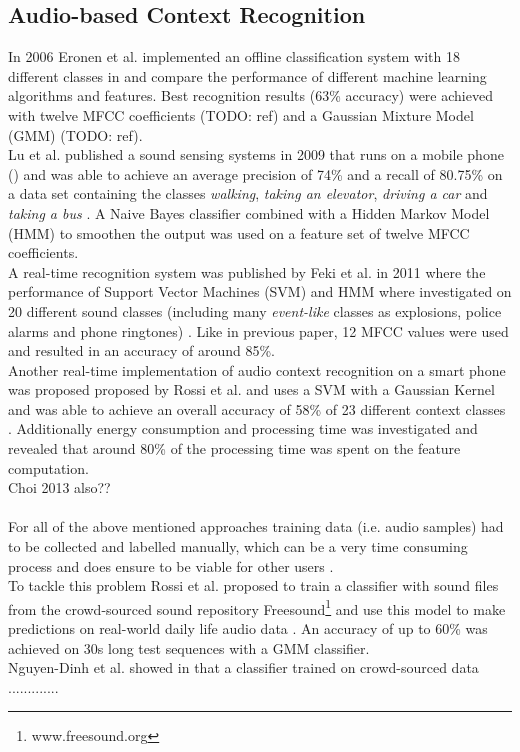 \subsection{Audio-based Context Recognition}\label{abc}
In 2006 Eronen et al. implemented an offline classification system with 18 different classes in \cite{Eronen2006} and compare the performance of different machine learning algorithms and features. Best recognition results (63\% accuracy) were achieved with twelve MFCC coefficients (TODO: ref) and a Gaussian Mixture Model (GMM) (TODO: ref).\\
Lu et al. published a sound sensing systems in 2009 that runs on a mobile phone () and was able to achieve an average precision of 74\% and a recall of 80.75\% on a data set containing the classes \textit{walking}, \textit{taking an elevator}, \textit{driving a car} and \textit{taking a bus} \cite{Lu2009}. A Naive Bayes classifier combined with a Hidden Markov Model (HMM) to smoothen the output was used on a feature set of twelve MFCC coefficients.\\
A real-time recognition system was published by Feki et al. in 2011 where the performance of Support Vector Machines (SVM) and HMM where investigated on 20 different sound classes (including many \textit{event-like} classes as explosions, police alarms and phone ringtones) \cite{Feki2011}. Like in previous paper, 12 MFCC values were used and resulted in an accuracy of around 85\%.\\
Another real-time implementation of audio context recognition on a smart phone was proposed proposed by Rossi et al. and uses a SVM with a Gaussian Kernel and was able to achieve an overall accuracy of 58\% of 23 different context classes \cite{Rossi2013}. Additionally energy consumption and processing time was investigated and revealed that around 80\% of the processing time was spent on the feature computation.\\
Choi 2013 also?? \\
\\
For all of the above mentioned approaches training data (i.e. audio samples) had to be collected and labelled manually, which can be a very time consuming process and does ensure to be viable for other users \cite{Rossi2012}.\\
To tackle this problem Rossi et al. proposed to train a classifier with sound files from the crowd-sourced sound repository Freesound\footnote{www.freesound.org} and use this model to make predictions on real-world daily life audio data \cite{Rossi2012}. An accuracy of up to 60\% was achieved on 30s long test sequences with a GMM classifier.\\
Nguyen-Dinh et al. showed in \cite{Nguyen-Dinh2013} that a classifier trained on crowd-sourced data .............

